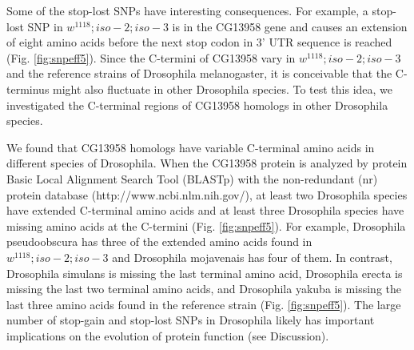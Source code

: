 
Some of the stop-lost SNPs have interesting consequences. For example, a stop-lost SNP in $w^{1118} ; iso-2; iso-3$ is in the CG13958 gene and causes an extension of eight amino acids before the next stop codon in 3' UTR sequence is reached (Fig. \ref{fig:snpeff5}). Since the C-termini of CG13958 vary in $w^{1118} ; iso-2; iso-3$ and the reference strains of Drosophila melanogaster, it is conceivable that the C-terminus might also fluctuate in other Drosophila species. To test this idea, we investigated the C-terminal regions of CG13958 homologs in other Drosophila species.


We found that CG13958 homologs have variable C-terminal amino acids in different species of Drosophila. When the CG13958 protein is analyzed by protein Basic Local Alignment Search Tool (BLASTp) with the non-redundant (nr) protein database (http://www.ncbi.nlm.nih.gov/), at least two Drosophila species have extended C-terminal amino acids and at least three Drosophila species have missing amino acids at the C-termini (Fig. \ref{fig:snpeff5}). For example, Drosophila pseudoobscura has three of the extended amino acids found in $w^{1118} ; iso-2; iso-3$ and Drosophila mojavenais has four of them. In contrast, Drosophila simulans is missing the last terminal amino acid, Drosophila erecta is missing the last two terminal amino acids, and Drosophila yakuba is missing the last three amino acids found in the reference strain (Fig. \ref{fig:snpeff5}). The large number of stop-gain and stop-lost SNPs in Drosophila likely has important implications on the evolution of protein function (see Discussion).

